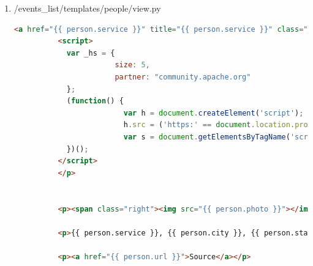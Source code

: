 \documentclass[letterpaper,10pt,onecolumn]{IEEEtran} %
\begin{document}
\begin{enumerate}
\begin{center}
\begin{lstlisting}[language=Python]
            data = json.loads(result)
            members = data['results']

            for member in members:
                try:
                    person = Person.objects.get(meetupID = member['id'])
                except Person.DoesNotExist:
                    person = Person()

                try:
                    person.meetupID = member['id']
                    person.name = member['name']
                    #person.service = member['other_services']['twitter']['identifier']
                    person.country = member['country']
                    if 'other_services' in member.keys():
                        if 'twitter' in member['other_services'].keys():
                            if 'identifier' in member['other_services']['twitter'].keys():
                                person.service = member['other_services']['twitter']['identifier']
      \end{lstlisting}
    \end{center}

  \item /events\_list/templates/people/view.py
    \begin{center}
      \begin{lstlisting}[language=HTML]
        <a href="{{ person.service }}" title="{{ person.service }}" class="_hs_socialshare" > Tweet at this Person </a>
          <script>
            var _hs = {
                       size: 5,
                       partner: "community.apache.org"
            };
            (function() {
                         var h = document.createElement('script'); h.type = 'text/javascript'; h.async = true;
                         h.src = ('https:' == document.location.protocol ? 'https://' : 'http://') + 'dtirydke3kdq7.cloudfront.net/hootlet.js?v=1';
                         var s = document.getElementsByTagName('script')[0]; s.parentNode.insertBefore(h, s);
            })();
          </script>
          </p>


          <p><span class="right"><img src="{{ person.photo }}"></img></span> {{ person.bio }}</p>

          <p>{{ person.service }}, {{ person.city }}, {{ person.state }}, {{ person.country }} ({{ person.latitude }}, {{ person.longitude }})</p>

          <p><a href="{{ person.url }}">Source</a></p>
      \end{lstlisting}
    \end{center}
\end{enumerate}
\end{document}

